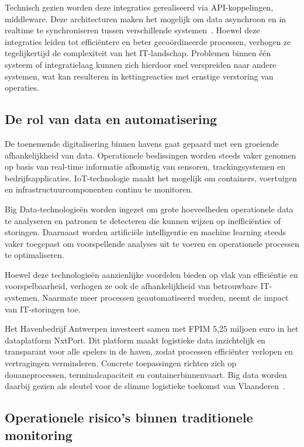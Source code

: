 Technisch gezien worden deze integraties gerealiseerd via API-koppelingen, middleware. Deze architecturen maken het mogelijk om data asynchroon en in realtime te synchroniseren tussen verschillende systemen~\autocite{Saminathan2021}. Hoewel deze integraties leiden tot efficiëntere en beter gecoördineerde processen, verhogen ze tegelijkertijd de complexiteit van het IT-landschap. Problemen binnen één systeem of integratielaag kunnen zich hierdoor snel verspreiden naar andere systemen, wat kan resulteren in kettingreacties met ernstige verstoring van operaties.

\subsection{De rol van data en automatisering}

De toenemende digitalisering binnen havens gaat gepaard met een groeiende afhankelijkheid van data. Operationele beslissingen worden steeds vaker genomen op basis van real-time informatie afkomstig van sensoren, trackingsystemen en bedrijfsapplicaties. IoT-technologie maakt het mogelijk om containers, voertuigen en infrastructuurcomponenten continu te monitoren.

Big Data-technologieën worden ingezet om grote hoeveelheden operationele data te analyseren en patronen te detecteren die kunnen wijzen op inefficiënties of storingen. Daarnaast worden artificiële intelligentie en machine learning steeds vaker toegepast om voorspellende analyses uit te voeren en operationele processen te optimaliseren.

Hoewel deze technologieën aanzienlijke voordelen bieden op vlak van efficiëntie en voorspelbaarheid, verhogen ze ook de afhankelijkheid van betrouwbare IT-systemen. Naarmate meer processen geautomatiseerd worden, neemt de impact van IT-storingen toe.

Het Havenbedrijf Antwerpen investeert samen met FPIM 5,25 miljoen euro in het dataplatform NxtPort. Dit platform maakt logistieke data inzichtelijk en transparant voor alle spelers in de haven, zodat processen efficiënter verlopen en vertragingen verminderen. Concrete toepassingen richten zich op douaneprocessen, terminalcapaciteit en containerbinnenvaart. Big data worden daarbij gezien als sleutel voor de slimme logistieke toekomst van Vlaanderen~\autocite{Slegers2017}.

\subsection{Operationele risico’s binnen traditionele monitoring}

